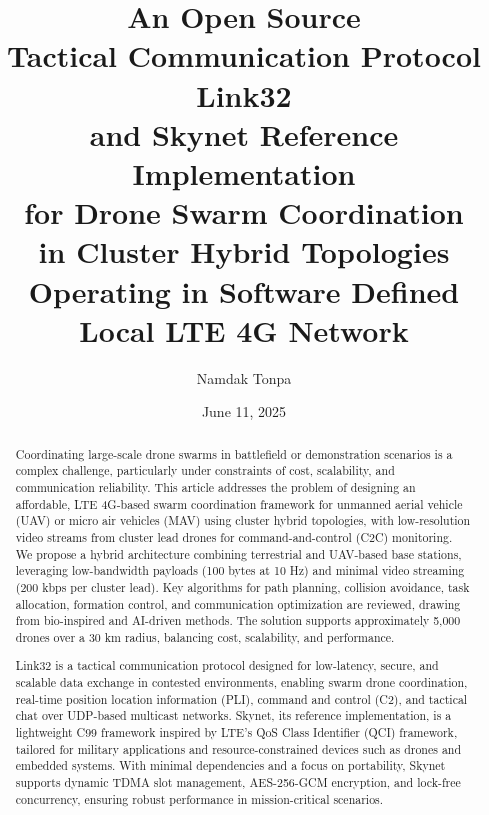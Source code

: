 \documentclass{article}
\begin{document}
\title{ An Open Source                          \\
        Tactical Communication Protocol Link32   \\
        and Skynet Reference Implementation       \\
        for Drone Swarm Coordination \\
        in Cluster Hybrid Topologies  \\
        Operating in Software Defined  \\
        Local LTE 4G Network            \\ }

\author{Namdak Tonpa}
\date{June 11, 2025}
\maketitle

\begin{abstract}
Coordinating large-scale drone swarms in battlefield or demonstration scenarios
is a complex challenge, particularly under constraints of cost, scalability,
and communication reliability. This article addresses the problem of designing an affordable,
LTE 4G-based swarm coordination framework for unmanned aerial vehicle (UAV)
or micro air vehicles (MAV) using cluster hybrid topologies,
with low-resolution video streams from cluster lead drones for
command-and-control (C2C) monitoring. We propose a hybrid architecture combining
terrestrial and UAV-based base stations, leveraging low-bandwidth
payloads (100 bytes at 10 Hz) and minimal video streaming (200 kbps per cluster lead).
Key algorithms for path planning, collision avoidance, task allocation, formation control,
and communication optimization are reviewed, drawing from bio-inspired and AI-driven methods.
The solution supports approximately 5,000 drones over a 30 km radius, balancing cost,
scalability, and performance.

Link32 is a tactical communication protocol designed for low-latency, secure, and scalable data
exchange in contested environments, enabling swarm drone coordination, real-time position location
information (PLI), command and control (C2), and tactical chat over UDP-based multicast networks.
Skynet, its reference implementation, is a lightweight C99 framework inspired by LTE’s QoS Class
Identifier (QCI) framework, tailored for military applications and resource-constrained devices
such as drones and embedded systems. With minimal dependencies and a focus on portability, Skynet
supports dynamic TDMA slot management, AES-256-GCM encryption, and lock-free concurrency, ensuring
robust performance in mission-critical scenarios.
\end{abstract}
\end{document}
